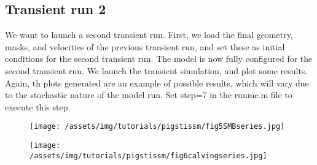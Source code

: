 \subsection{Transient run 2}%
We want to launch a second transient run. First, we load the final geometry, masks, and velocities of the previous transient run, and set these as initial conditions for the second transient run. The model is now fully configured for the second transient run. We launch the transient simulation, and plot some results. Again, th plots generated are an example of possible results, which will vary due to the stochastic nature of the model run.
Set step=7 in the runme.m file to execute this step.
\begin{figure}
	\begin{center}
		\texttt{[image: /assets/img/tutorials/pigstissm/fig5SMBseries.jpg]}
	\end{center}
\end{figure}
\begin{figure}
	\begin{center}
		\texttt{[image: /assets/img/tutorials/pigstissm/fig6calvingseries.jpg]}
	\end{center}
\end{figure}
